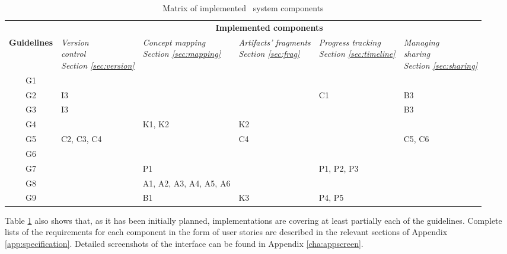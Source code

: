 \begin{table}[htb]
  \begin{center} \small
    \begin{tabular}{| c || p{2cm} | p{2cm} | p{2cm} | p{2cm} | p{2cm} |}
    \hline
     \multicolumn{1}{|c||}{} &
     \multicolumn{5}{c|}{\textbf{Implemented components}} \\ \cline{2-6}
     \textbf{Guidelines} & 
     \textit{Version \newline control \newline Section \ref{sec:version}} & 
     \textit{Concept mapping \newline Section \ref{sec:mapping}} & 
     \textit{Artifacts' fragments \newline Section \ref{sec:frag}} & 
     \textit{Progress tracking \newline Section \ref{sec:timeline}} & 
     \textit{Managing \newline sharing \newline Section \ref{sec:sharing}} \\
     \hline \hline
     \rowcolor[gray]{.8} G1 & & & & & \\ \hline
     G2 & I3 & & & C1 & B3\\ \hline
     G3 & I3 & & & & B3 \\ \hline
     G4 & & K1, K2 & K2 & & \\ \hline
     G5 & C2, C3, C4 & & C4 & & C5, C6 \\ \hline
     \rowcolor[gray]{.8} G6 & & & & & \\ \hline
     G7 & & P1 & & P1, P2, P3 & \\ \hline
     G8 & & A1, A2, A3, \newline A4, A5, A6 & & & \\ \hline
     G9 & & B1 & K3 & P4, P5 & \\ \hline
    \end{tabular}
  \end{center}
  \caption{Matrix of implemented \ep~system components}  
  \label{tab:implement}
\end{table}

\FloatBarrier

Table \ref{tab:implement} also shows that, as it has been initially planned,
implementations are covering at least partially each of the guidelines. Complete
lists of the requirements for each component in the form of user stories are
described in the relevant sections of Appendix \ref{app:specification}. Detailed
screenshots of the interface can be found in Appendix \ref{cha:appscreen}.

